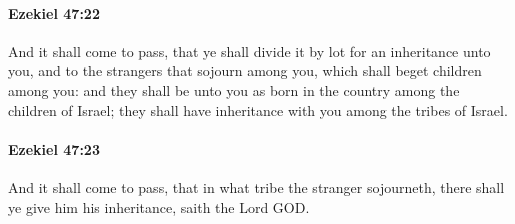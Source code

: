 		\paragraph{Ezekiel 47:22} %
			\label{EZEKIEL-47-22}

			And it shall come to pass, that ye shall divide it by lot for an inheritance unto you, and to the strangers that sojourn among you, which shall beget children among you: and they shall be unto you as born in the country among the children of Israel; they shall have inheritance with you among the tribes of Israel.


		\paragraph{Ezekiel 47:23} %
			\label{EZEKIEL-47-23}

			And it shall come to pass, that in what tribe the stranger sojourneth, there shall ye give him his inheritance, saith the Lord GOD.


